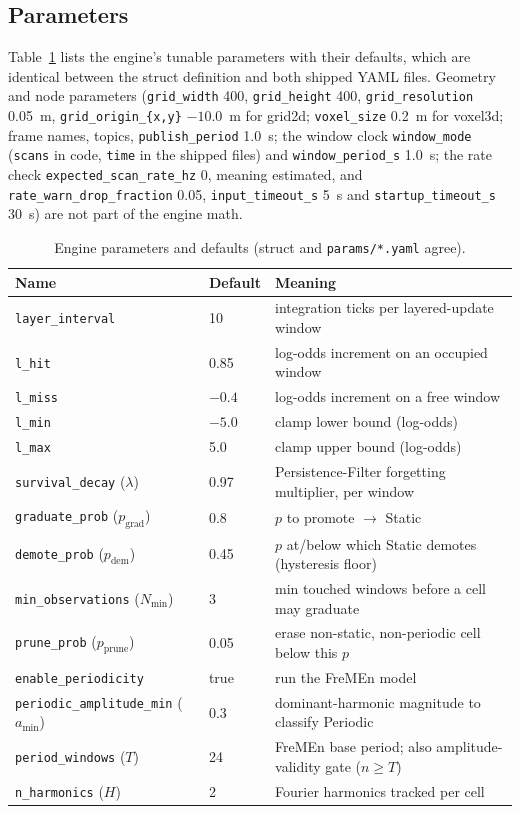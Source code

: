 \documentclass[conference]{IEEEtran}
\begin{document}
\subsection{Parameters}
\label{sec:params}

Table~\ref{tbl:params} lists the engine's tunable parameters with their defaults, which
are identical between the struct definition and both shipped YAML files. Geometry
and node parameters (\texttt{grid\_width} 400, \texttt{grid\_height} 400, \texttt{grid\_resolution}
0.05~m, \texttt{grid\_origin\_\{x,y\}} $-10.0$~m for grid2d; \texttt{voxel\_size} 0.2~m for voxel3d;
frame names, topics, \texttt{publish\_period} 1.0~s; the window clock \texttt{window\_mode} (\texttt{scans} in code, \texttt{time} in the shipped files) and \texttt{window\_period\_s} 1.0~s; the rate check
\texttt{expected\_scan\_rate\_hz} 0, meaning estimated, and
\texttt{rate\_warn\_drop\_fraction} 0.05, \texttt{input\_timeout\_s} 5~s and \texttt{startup\_timeout\_s} 30~s) are not part of the engine math.

\begin{table}[t]
\centering
\caption{Engine parameters and defaults (struct and \texttt{params/*.yaml} agree).}
\label{tbl:params}
\begin{tabular}{@{}p{}p{}p{}@{}}
\toprule
Name & Default & Meaning \\
\midrule
\texttt{layer\_interval} & 10 & integration ticks per layered-update window \\
\texttt{l\_hit} & 0.85 & log-odds increment on an occupied window \\
\texttt{l\_miss} & $-0.4$ & log-odds increment on a free window \\
\texttt{l\_min} & $-5.0$ & clamp lower bound (log-odds) \\
\texttt{l\_max} & 5.0 & clamp upper bound (log-odds) \\
\texttt{survival\_decay} ($\lambda$) & 0.97 & Persistence-Filter forgetting multiplier, per window \\
\texttt{graduate\_prob} ($p_{\text{grad}}$) & 0.8 & $p$ to promote $\to$ Static \\
\texttt{demote\_prob} ($p_{\text{dem}}$) & 0.45 & $p$ at/below which Static demotes (hysteresis floor) \\
\texttt{min\_observations} ($N_{\min}$) & 3 & min touched windows before a cell may graduate \\
\texttt{prune\_prob} ($p_{\text{prune}}$) & 0.05 & erase non-static, non-periodic cell below this $p$ \\
\texttt{enable\_periodicity} & true & run the FreMEn model \\
\texttt{periodic\_amplitude\_min} ($a_{\min}$) & 0.3 & dominant-harmonic magnitude to classify Periodic \\
\texttt{period\_windows} ($T$) & 24 & FreMEn base period; also amplitude-validity gate ($n\ge T$) \\
\texttt{n\_harmonics} ($H$) & 2 & Fourier harmonics tracked per cell \\
\bottomrule
\end{tabular}
\end{table}
\end{document}
